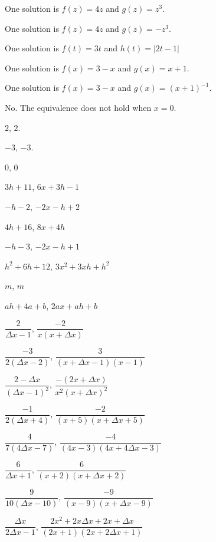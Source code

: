 \begin{exenum}
\item One solution is $f(z) = 4z$ and $g(z) = z^3$. 
\item One solution is $f(z) = 4z$ and $g(z) = - z^3$. 
\item One solution is  $f(t) = 3t$ and $h(t) = |2t-1|$ 
\item One solution is $f(x) = 3-x$ and $g(x) = x+1$.  
\item  One solution is $f(x) = 3-x$ and $g(x) = (x+1)^{-1}$.  
\item No.  The equivalence does not hold when $x = 0$.

\addtocounter{enumi}{1}

\item $2$, $2$.
\item $-3$, $-3$.

\item $0$, $0$
\item $3h+11$, $6x+3h-1$

\item $-h-2$, $-2x-h+2$
\item  $4h+16$, $8x+4h$

\item $-h-3$, $-2x-h+1$
\item $h^2+6h+12$, $3x^{2} + 3xh + h^{2}$

\item $m$, $m$
\item $ah + 4a+b$, $2ax + ah + b$


\item  $\dfrac{2}{\Delta x-1}$, $\dfrac{-2}{x(x+\Delta x)}$
\item $\dfrac{-3}{2(\Delta x - 2)}$, $\dfrac{3}{(x+\Delta x-1)(x-1)}$


\item  $\dfrac{2-\Delta x}{(\Delta x - 1)^2}$, $\dfrac{-(2x+\Delta x)}{x^2(x+\Delta x)^2}$
\item  $\dfrac{-1}{2(\Delta x+4)}$, $\dfrac{-2}{(x+5)(x+\Delta x+5)}$

\item $\dfrac{4}{7(4 \Delta x - 7)}$, $\dfrac{-4}{(4x-3)(4x+4\Delta x-3)}$
\item $\dfrac{6}{\Delta x + 1}$, $\dfrac{6}{(x+2)(x+\Delta x+2)}$

\item $\dfrac{9}{10(\Delta x - 10)}$, $\dfrac{-9}{(x - 9)(x + \Delta x - 9)}$
\item $\dfrac{\Delta x}{2 \Delta x - 1}$, $\dfrac{2x^2+2x\Delta x+2x+\Delta x}{(2x+1)(2x+2\Delta x+1)}$


\end{exenum}
